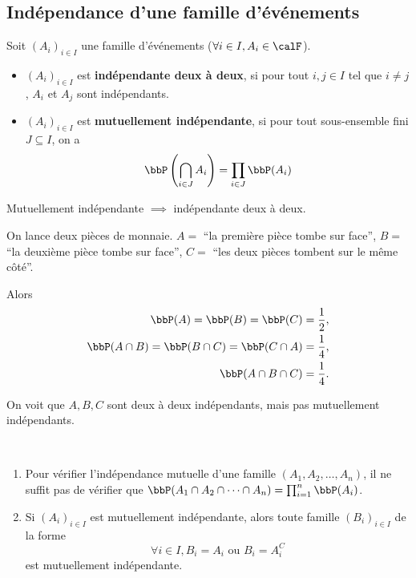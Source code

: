 \subsection*{Indépendance d'une famille d'événements}

\begin{deff}
    Soit $(A_i)_{i \in I}$ une famille d'événements ($\forall i \in I, A_i \in \calF$).
    \begin{itemize}
        \item $(A_i)_{i \in I}$ est \textbf{indépendante deux à deux},
              si pour tout $i, j \in I$ tel que $i \neq j$, $A_i$ et $A_j$ sont indépendants.
        \item $(A_i)_{i \in I}$ est \textbf{mutuellement indépendante},
              si pour tout sous-ensemble fini $J \subseteq I$, on a
              \[ \bbP \left(\bigcap_{i \in J} A_i\right) = \prod_{i \in J} \bbP(A_i) \]
    \end{itemize}
\end{deff}

\begin{rqq}
    Mutuellement indépendante $\implies$ indépendante deux à deux.
\end{rqq}

\begin{exem}
    On lance deux pièces de monnaie.
    $A =$ ``la première pièce tombe sur face'',
    $B =$ ``la deuxième pièce tombe sur face'',
    $C =$ ``les deux pièces tombent sur le même côté''.

    Alors
    \begin{align*}
        \bbP(A) = \bbP(B) = \bbP(C) &= \frac{1}{2}, \\
        \bbP(A \cap B) = \bbP(B \cap C) = \bbP(C \cap A) &= \frac{1}{4}, \\
        \bbP(A \cap B \cap C) &= \frac{1}{4}.
    \end{align*}

    On voit que $A, B, C$ sont deux à deux indépendants, mais pas mutuellement indépendants.
\end{exem}

\begin{rqq}
    $\ $
    \begin{enumerate}
        \item Pour vérifier l'indépendance mutuelle d'une famille $(A_1, A_2, \ldots, A_n)$,
              il ne suffit pas de vérifier que $\bbP(A_1 \cap A_2 \cap \cdots \cap A_n) = \prod_{i=1}^n \bbP(A_i)$.
        \item Si $(A_i)_{i \in I}$ est mutuellement indépendante,
              alors toute famille $(B_i)_{i \in I}$ de la forme
              \[ \forall i \in I, B_i = A_i \text{ ou } B_i = A_i^C \]
              est mutuellement indépendante.
    \end{enumerate}
\end{rqq}

